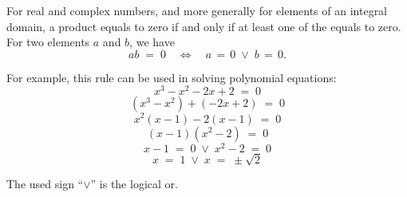 \documentclass[12pt]{article}
\begin{document}
For real and complex numbers, and more generally for elements of an integral domain, a product equals to zero if and only if at least one of the  equals to zero.\, For two elements $a$ and $b$, we have
    $$ab \;=\; 0 \quad \Longleftrightarrow \quad a \,=\, 0\; \lor \;b \,=\, 0. $$

For example, this rule can be used in solving polynomial equations:
$$x^3\!-\!x^2\!-\!2x\!+\!2 \;=\; 0$$
$$(x^3\!-\!x^2)\!+\!(-2x\!+\!2) \;=\; 0$$
$$x^2(x\!-\!1)\!-\!2(x\!-\!1) \;=\; 0$$
$$(x\!-\!1)(x^2\!-\!2) \;=\; 0$$
$$x\!-\!1 \;=\; 0 \;\lor\; x^2\!-\!2 \;=\; 0$$
$$x \;=\; 1 \;\lor\; x \;=\; \pm\sqrt{2}$$

The used sign ``$\lor$'' is the logical or.
\end{document}
